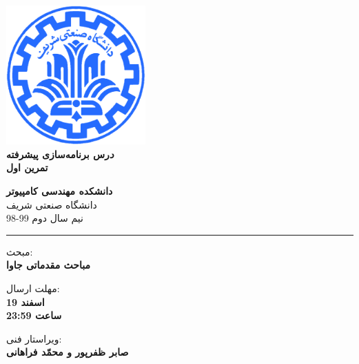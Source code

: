 \documentclass[]{article}
\begin{document}
\begin{titlepage}
\begin{center}
        
\vspace*{0.7cm}

\includegraphics[width=0.4\textwidth]{sharif1.png}\\
\vspace{0.5cm}
\textbf{ \Huge{\emph درس برنامه‌سازی پیشرفته} }\\
\vspace{0.5cm}
\textbf{ \Large{ تمرین اول} }
\vspace{0.2cm}
       
 
      \large \textbf{دانشکده مهندسی کامپیوتر}\\\vspace{0.2cm}
    \large   دانشگاه صنعتی شریف\\\vspace{0.2cm}
       \large   ﻧﯿﻢ سال دوم 99-98 \\\vspace{0.2cm}
      \noindent\rule[1ex]{\linewidth}{1pt}
    مبحث:\\
    \textbf{{مباحث مقدماتی جاوا}}

    \vspace{0.20cm}

   مهلت ارسال:\\
    \textbf{{19 اسفند}}\\
    \textbf{{ساعت 23:59}}

    \vspace{0.15cm}
ویراستار فنی:\\
    \textbf{{صابر ظفر‌پور و محمّد فراهانی}}
\end{center}
\end{titlepage}


\newpage
\pagestyle{fancy}
\fancyhf{}
\fancyfoot{}
\cfoot{\thepage}
\end{document}
